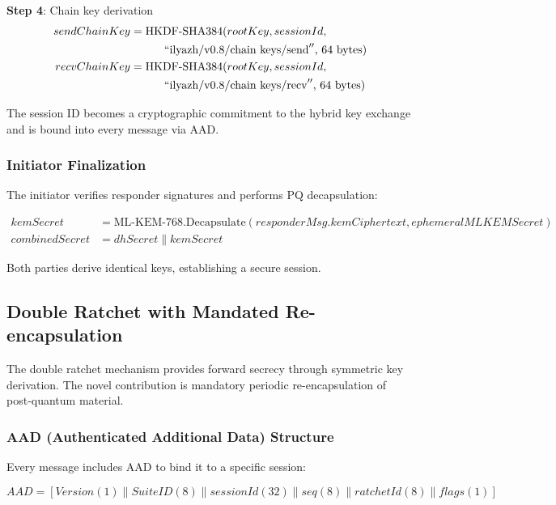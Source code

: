 \documentclass[11pt,a4paper,oneside]{article}
\begin{document}
\textbf{Step 4}: Chain key derivation
\begin{align*}
sendChainKey &= \text{HKDF-SHA384}(rootKey, sessionId, \\
&\quad\quad\quad ``\text{ilyazh/v0.8/chain keys/send}''\text{, } 64\text{ bytes}) \\
recvChainKey &= \text{HKDF-SHA384}(rootKey, sessionId, \\
&\quad\quad\quad ``\text{ilyazh/v0.8/chain keys/recv}''\text{, } 64\text{ bytes})
\end{align*}

The session ID becomes a cryptographic commitment to the hybrid key exchange and is bound into every message via AAD.

\subsubsection{Initiator Finalization}

The initiator verifies responder signatures and performs PQ decapsulation:

\begin{align*}
kemSecret &= \text{ML-KEM-768.Decapsulate}(responderMsg.kemCiphertext, ephemeralMLKEMSecret) \\
combinedSecret &= dhSecret \| kemSecret
\end{align*}

Both parties derive identical keys, establishing a secure session.

\subsection{Double Ratchet with Mandated Re-encapsulation}

The double ratchet mechanism provides forward secrecy through symmetric key derivation. The novel contribution is mandatory periodic re-encapsulation of post-quantum material.

\subsubsection{AAD (Authenticated Additional Data) Structure}

Every message includes AAD to bind it to a specific session:

\begin{equation}
AAD = [Version(1) \| SuiteID(8) \| sessionId(32) \| seq(8) \| ratchetId(8) \| flags(1)]
\end{equation}
\end{document}

